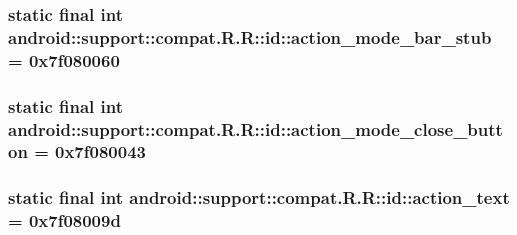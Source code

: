 \hypertarget{classandroid_1_1support_1_1compat_1_1_r_1_1id_58169a68190c00709090141855390dd4}{
\subsubsection[{action\_\-mode\_\-bar\_\-stub}]{\setlength{\rightskip}{0pt plus 5cm}static final int android::support::compat.R.R::id::action\_\-mode\_\-bar\_\-stub = 0x7f080060}}
\label{classandroid_1_1support_1_1compat_1_1_r_1_1id_58169a68190c00709090141855390dd4}


\hypertarget{classandroid_1_1support_1_1compat_1_1_r_1_1id_80cb70befc39672fa0a049d16ebf3a83}{
\subsubsection[{action\_\-mode\_\-close\_\-button}]{\setlength{\rightskip}{0pt plus 5cm}static final int android::support::compat.R.R::id::action\_\-mode\_\-close\_\-button = 0x7f080043}}
\label{classandroid_1_1support_1_1compat_1_1_r_1_1id_80cb70befc39672fa0a049d16ebf3a83}


\hypertarget{classandroid_1_1support_1_1compat_1_1_r_1_1id_fe89be4050a3b392659e3c62d6260ccb}{
\subsubsection[{action\_\-text}]{\setlength{\rightskip}{0pt plus 5cm}static final int android::support::compat.R.R::id::action\_\-text = 0x7f08009d}}
\label{classandroid_1_1support_1_1compat_1_1_r_1_1id_fe89be4050a3b392659e3c62d6260ccb}


